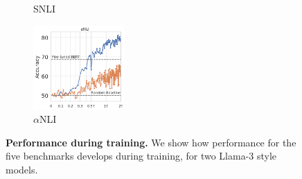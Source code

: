 \begin{figure}[t]
\begin{subfigure}[b]{0.19\textwidth}
    \caption{SNLI}
    \label{fig:snli_int}
    \end{subfigure}
    \begin{subfigure}[b]{0.19\textwidth}
    \centering
    \includegraphics[height=3.2cm, trim=11mm 0 0 0, clip]{figures/abductivenli_intermediate}
    \caption{$\alpha$NLI}
    \label{fig:alphanli_int}
    \end{subfigure}
    \caption{\textbf{Performance during training.} We show how performance for the five benchmarks develops during training, for two Llama-3 style models.}\label{fig:performance_training}
\end{figure}

\begin{table}
\centering
{}
\caption{\textbf{Monotonicity values.} Monotonicity values for the 8B and 70B models during the course of training. We report monotonicity both for accuracy ($mon_{Acc}$) and negative log likelihood of the correct answer ($mon_{NLL}$).}
\label{tab:monotonicity}
\end{table}


